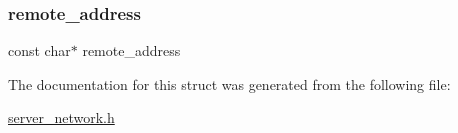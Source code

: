 \mbox{\label{structbt__server__client_a74df07aa1669bf94640440544efbd71c}} 
\subsubsection{\texorpdfstring{remote\+\_\+address}{remote\_address}}
{\footnotesize\ttfamily const char$\ast$ remote\+\_\+address}



The documentation for this struct was generated from the following file\+:\begin{DoxyCompactItemize}
\item 
\hyperlink{server__network_8h}{server\+\_\+network.\+h}\end{DoxyCompactItemize}
